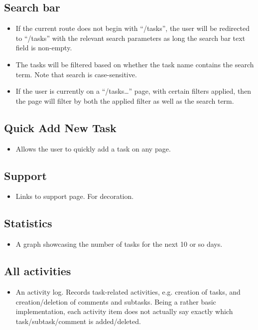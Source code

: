 \documentclass{article}
\begin{document}
\subsection{Search bar}
\begin{itemize}
  \item If the current route does not begin with “/tasks”, the user will be redirected to “/tasks” with the relevant search parameters as long the search bar text field is non-empty.
  \item The tasks will be filtered based on whether the task name contains the search term.  Note that search is case-sensitive.
  \item If the user is currently on a “/tasks…” page, with certain filters applied, then the page will filter by both the applied filter as well as the search term.
\end{itemize}


\subsection{Quick Add New Task}
\begin{itemize}
  \item Allows the user to quickly add a task on any page.
\end{itemize}


\subsection{Support}
\begin{itemize}
  \item Links to support page. For decoration.
\end{itemize}


\subsection{Statistics}
\begin{itemize}
  \item A graph showcasing the number of tasks for the next 10 or so days.

\end{itemize}

\subsection{All activities}
\begin{itemize}
  \item An activity log. Records task-related activities, e.g. creation of tasks, and creation/deletion of comments and subtasks. Being a rather basic implementation, each activity item does not actually say exactly which task/subtask/comment is added/deleted.
\end{itemize}
\end{document}
